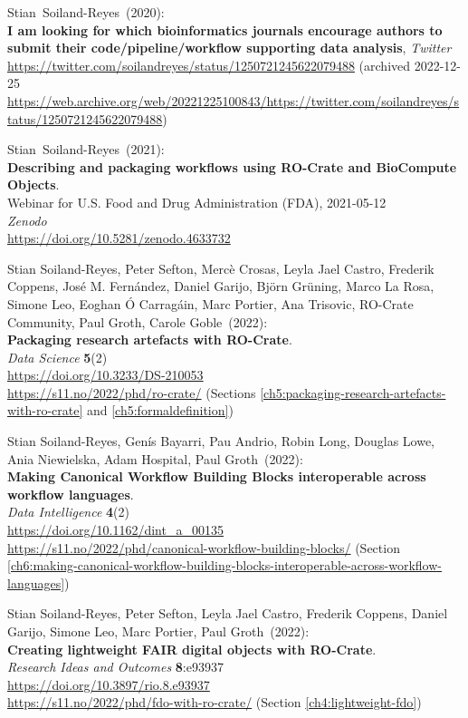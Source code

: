 \begin{thebibliography}{9}
Stian~Soiland-Reyes~(2020): \\
\textbf{I am looking for which bioinformatics journals encourage authors to submit their code/pipeline/workflow supporting data analysis},
\emph{Twitter}\\
\url{https://twitter.com/soilandreyes/status/1250721245622079488}
(archived 2022-12-25 
\url{https://web.archive.org/web/20221225100843/https://twitter.com/soilandreyes/status/1250721245622079488})

Stian~Soiland-Reyes~(2021): \\
\textbf{Describing and packaging workflows using RO-Crate and BioCompute Objects}.\\
Webinar for U.S. Food and Drug Administration
(FDA), 2021-05-12\\
\emph{Zenodo}\\
\url{https://doi.org/10.5281/zenodo.4633732}

Stian Soiland-Reyes, Peter Sefton, Mercè Crosas, Leyla Jael Castro, Frederik Coppens, José M. Fernández, Daniel Garijo, Björn Grüning, Marco La Rosa, Simone Leo, Eoghan Ó Carragáin, Marc Portier, Ana Trisovic, RO-Crate Community, Paul Groth, Carole Goble~(2022): \\
\textbf{Packaging research artefacts with RO-Crate}.\\
\emph{Data Science} \textbf{5}(2)\\
\url{https://doi.org/10.3233/DS-210053}\\
\url{https://s11.no/2022/phd/ro-crate/}
(Sections \vref{ch5:packaging-research-artefacts-with-ro-crate} and \vref{ch5:formaldefinition})

Stian Soiland-Reyes, Genís Bayarri, Pau Andrio, Robin Long, Douglas Lowe, Ania Niewielska, Adam Hospital, Paul Groth~(2022): \\
\textbf{Making Canonical Workflow Building Blocks interoperable across workflow languages}.\\
\emph{Data Intelligence} \textbf{4}(2)\\
\url{https://doi.org/10.1162/dint_a_00135}\\
\url{https://s11.no/2022/phd/canonical-workflow-building-blocks/}
(Section \vref{ch6:making-canonical-workflow-building-blocks-interoperable-across-workflow-languages})

Stian Soiland-Reyes, Peter Sefton, Leyla Jael Castro, Frederik Coppens, Daniel Garijo, Simone Leo, Marc Portier, Paul Groth~(2022): \\
\textbf{Creating lightweight FAIR digital objects with RO-Crate}.\\
\emph{Research Ideas and Outcomes} \textbf{8}:e93937 \\
\url{https://doi.org/10.3897/rio.8.e93937} \\
\url{https://s11.no/2022/phd/fdo-with-ro-crate/}
(Section \vref{ch4:lightweight-fdo})


\end{thebibliography}
